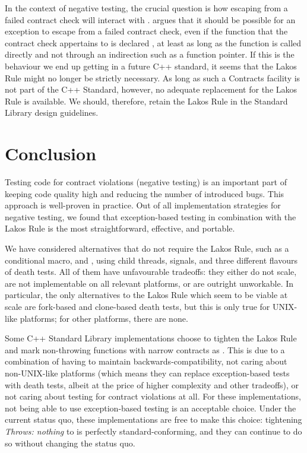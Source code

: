 In the context of negative testing, the crucial question is how escaping from a failed contract check will interact with . \cite{P2780R0} argues that it should be possible for an exception to escape from a failed contract check, even if the function that the contract check appertains to is declared , at least as long as the function is called directly and not through an indirection such as a function pointer. If this is the behaviour we end up getting in a future C++ standard, it seems that the Lakos Rule might no longer be strictly necessary. As long as such a Contracts facility is not part of the C++ Standard, however, no adequate replacement for the Lakos Rule is available. We should, therefore, retain the Lakos Rule in the Standard Library design guidelines.

\section{Conclusion}

Testing code for contract violations (negative testing) is an important part of keeping code quality high and reducing the number of introduced bugs. This approach is well-proven in practice. Out of all implementation strategies for negative testing, we found that exception-based testing in combination with the Lakos Rule is the most straightforward, effective, and portable.

We have considered alternatives that do not require the Lakos Rule, such as a conditional  macro,  and , using child threads, signals, and three different flavours of death tests. All of them have unfavourable tradeoffs: they either do not scale, are not implementable on all relevant platforms, or are outright unworkable. In particular, the only alternatives to the Lakos Rule which seem to be viable at scale are fork-based and clone-based death tests, but this is only true for UNIX-like platforms; for other platforms, there are none.

Some C++ Standard Library implementations choose to tighten the Lakos Rule and mark non-throwing functions with narrow contracts as . This is due to a combination of having to maintain backwards-compatibility, not caring about non-UNIX-like platforms (which means they can replace exception-based tests with death tests, albeit at the price of higher complexity and other tradeoffs), or not caring about testing for contract violations at all. For these implementations, not being able to use exception-based testing is an acceptable choice. Under the current status quo, these implementations are free to make this choice: tightening \emph{Throws: nothing} to  is perfectly standard-conforming, and they can continue to do so without changing the status quo.

